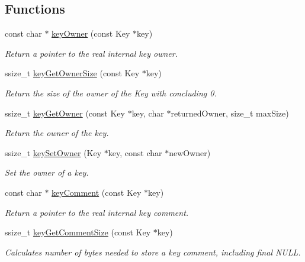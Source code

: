 \subsection*{Functions}
\begin{DoxyCompactItemize}
\item 
const char $\ast$ \hyperlink{group__meta_gaf6485fb8599714b6bbd830cf915ffea5}{key\-Owner} (const Key $\ast$key)
\begin{DoxyCompactList}\small\item\em Return a pointer to the real internal {\ttfamily key} owner. \end{DoxyCompactList}\item 
ssize\-\_\-t \hyperlink{group__meta_ga4a4561895741ba2ad10acf007c188593}{key\-Get\-Owner\-Size} (const Key $\ast$key)
\begin{DoxyCompactList}\small\item\em Return the size of the owner of the Key with concluding 0. \end{DoxyCompactList}\item 
ssize\-\_\-t \hyperlink{group__meta_ga35922a017bee8b4bcb493bbdfad9d6f5}{key\-Get\-Owner} (const Key $\ast$key, char $\ast$returned\-Owner, size\-\_\-t max\-Size)
\begin{DoxyCompactList}\small\item\em Return the owner of the key. \end{DoxyCompactList}\item 
ssize\-\_\-t \hyperlink{group__meta_ga88d6ec200ba0707b7c1b4a88133d2be4}{key\-Set\-Owner} (Key $\ast$key, const char $\ast$new\-Owner)
\begin{DoxyCompactList}\small\item\em Set the owner of a key. \end{DoxyCompactList}\item 
const char $\ast$ \hyperlink{group__meta_gac89fd319783b3457db45b4c09e55274a}{key\-Comment} (const Key $\ast$key)
\begin{DoxyCompactList}\small\item\em Return a pointer to the real internal {\ttfamily key} comment. \end{DoxyCompactList}\item 
ssize\-\_\-t \hyperlink{group__meta_ga0dd737fadc16d4cf16720d17f066a9d3}{key\-Get\-Comment\-Size} (const Key $\ast$key)
\begin{DoxyCompactList}\small\item\em Calculates number of bytes needed to store a key comment, including final N\-U\-L\-L. \end{DoxyCompactList}\item 

\end{DoxyCompactItemize}
